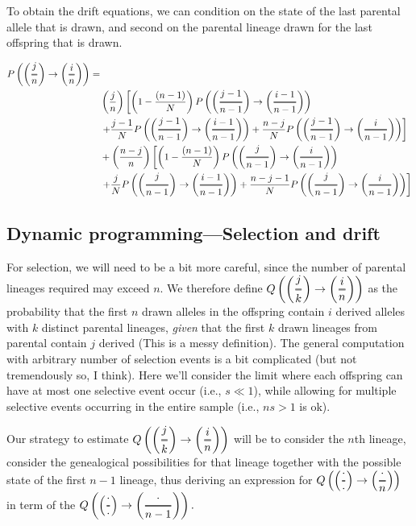 \documentclass[]{article}
\newcommand{\Dfrac}[2]{%
  \left(
  \ooalign{%
    $\genfrac{}{}{1.2pt}0{#1}{#2}$\cr%
    $\color{white}\genfrac{}{}{.4pt}0{\phantom{#1}}{\phantom{#2}}$}%
  \right)
}
\begin{document}
To obtain the drift equations, we can condition on the state of the last parental allele that is drawn, and second on the parental lineage drawn for the last offspring that is drawn. 

\begin{equation}
\begin{split}
 P\left(\Dfrac{j}{n} \rightarrow \Dfrac{i}{n} \right) =&\\& \left(\frac{j}{n}\right)\left[ \left(1-\frac{(n-1)}{N}\right) P\left(\Dfrac{j-1}{n-1} \rightarrow \Dfrac{i-1}{n-1} \right) \right. \\&
 \left.+ \frac{j-1}{N} P\left(\Dfrac{j-1}{n-1} \rightarrow \Dfrac{i-1}{n-1} \right)  +     \frac{n-j}{N} P\left(\Dfrac{j-1}{n-1} \rightarrow \Dfrac{i}{n-1} \right)     \right]
 \\&
 + \left(\frac{n-j}{n}\right)\left[ \left(1-\frac{(n-1)}{N}\right) P\left(\Dfrac{j}{n-1} \rightarrow \Dfrac{i}{n-1} \right) 
 \right. \\&
 \left.+ \frac{j}{N} P\left(\Dfrac{j}{n-1} \rightarrow \Dfrac{i-1}{n-1} \right) +     \frac{n-j-1}{N} P\left(\Dfrac{j}{n-1} \rightarrow \Dfrac{i}{n-1} \right)     \right]
\end{split}
\end{equation}


\subsection{Dynamic programming---Selection and drift}

For selection, we will need to be a bit more careful, since the number of parental lineages required may exceed $n$. We therefore define $Q\left(\Dfrac{j}{k} \rightarrow \Dfrac{i}{n} \right)$ as the probability that the first $n$ drawn alleles in the offspring contain $i$ derived alleles with $k$ distinct parental lineages, \emph{given} that the first $k$ drawn lineages from parental contain $j$ derived (This is a messy definition). 
The general computation with arbitrary number of selection events is a bit complicated (but not tremendously so, I think). Here we'll consider the limit where each offspring can have at most one selective event occur (i.e., 
$s\ll 1$), while allowing for multiple selective events occurring in the entire sample (i.e., $ns>1$ is ok). 

Our strategy to estimate $Q\left(\Dfrac{j}{k} \rightarrow \Dfrac{i}{n} \right)$ will be to consider the $n$th lineage, consider the genealogical possibilities for that lineage together with the possible state of the first $n-1$ lineage, thus deriving an expression for $Q\left(\Dfrac{\cdot}{\cdot} \rightarrow \Dfrac{\cdot}{n} \right)$ in term of the $Q\left(\Dfrac{\cdot}{\cdot} \rightarrow \Dfrac{\cdot}{n-1} \right). $
\end{document}
